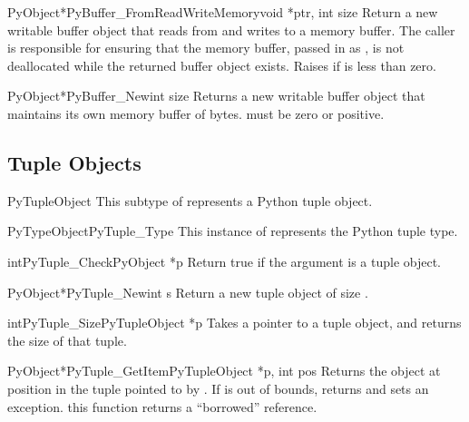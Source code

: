 \documentclass{manual}
\begin{document}
\begin{cfuncdesc}{PyObject*}{PyBuffer_FromReadWriteMemory}{void *ptr, int size}
Return a new writable buffer object that reads from and writes to a
memory buffer.  The caller is responsible for ensuring that the memory
buffer, passed in as , is not deallocated while the returned
buffer object exists.  Raises  if  is
less than zero.
\end{cfuncdesc}

\begin{cfuncdesc}{PyObject*}{PyBuffer_New}{int size}
Returns a new writable buffer object that maintains its own memory
buffer of  bytes.   must be zero or positive.
\end{cfuncdesc}


\subsection{Tuple Objects \label{tupleObjects}}

\begin{ctypedesc}{PyTupleObject}
This subtype of  represents a Python tuple object.
\end{ctypedesc}

\begin{cvardesc}{PyTypeObject}{PyTuple_Type}
This instance of  represents the Python tuple type.
\end{cvardesc}

\begin{cfuncdesc}{int}{PyTuple_Check}{PyObject *p}
Return true if the argument is a tuple object.
\end{cfuncdesc}

\begin{cfuncdesc}{PyObject*}{PyTuple_New}{int s}
Return a new tuple object of size .
\end{cfuncdesc}

\begin{cfuncdesc}{int}{PyTuple_Size}{PyTupleObject *p}
Takes a pointer to a tuple object, and returns the size
of that tuple.
\end{cfuncdesc}

\begin{cfuncdesc}{PyObject*}{PyTuple_GetItem}{PyTupleObject *p, int pos}
Returns the object at position  in the tuple pointed
to by .  If  is out of bounds, returns \NULL{} and
sets an  exception.   this
function returns a ``borrowed'' reference.
\end{cfuncdesc}
\end{document}
